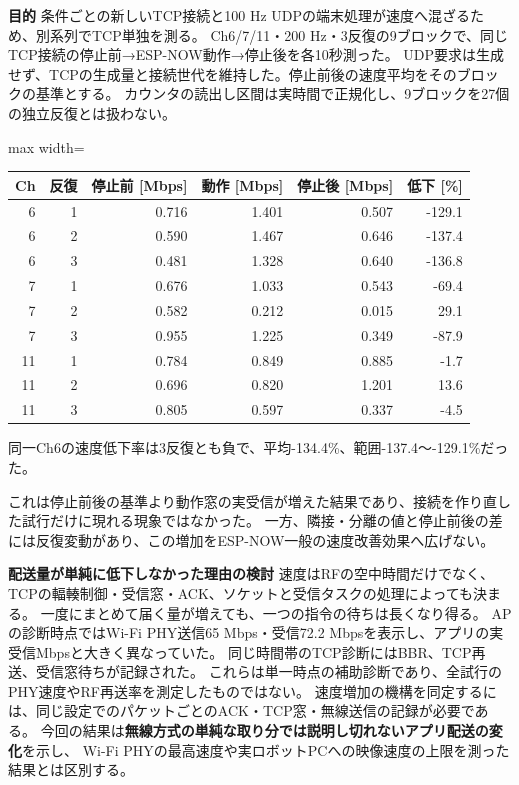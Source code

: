 \documentclass[a4paper,10pt]{ltjsarticle}
\begin{document}
\par\smallskip\noindent\textbf{目的}\quad
条件ごとの新しいTCP接続と100 Hz UDPの端末処理が速度へ混ざるため、別系列でTCP単独を測る。
Ch6/7/11・200 Hz・3反復の9ブロックで、同じTCP接続の停止前→ESP-NOW動作→停止後を各10秒測った。
UDP要求は生成せず、TCPの生成量と接続世代を維持した。停止前後の速度平均をそのブロックの基準とする。
カウンタの読出し区間は実時間で正規化し、9ブロックを27個の独立反復とは扱わない。
\begin{center}\small\begin{adjustbox}{max width=\linewidth}\begin{tabular}{rrrrrr}\toprule
Ch & 反復 & 停止前 [Mbps] & 動作 [Mbps] & 停止後 [Mbps] & 低下 [\%]\\\midrule
6 & 1 & 0.716 & 1.401 & 0.507 & -129.1\\
6 & 2 & 0.590 & 1.467 & 0.646 & -137.4\\
6 & 3 & 0.481 & 1.328 & 0.640 & -136.8\\
7 & 1 & 0.676 & 1.033 & 0.543 & -69.4\\
7 & 2 & 0.582 & 0.212 & 0.015 & 29.1\\
7 & 3 & 0.955 & 1.225 & 0.349 & -87.9\\
11 & 1 & 0.784 & 0.849 & 0.885 & -1.7\\
11 & 2 & 0.696 & 0.820 & 1.201 & 13.6\\
11 & 3 & 0.805 & 0.597 & 0.337 & -4.5\\
\bottomrule\end{tabular}\end{adjustbox}\end{center}
同一Ch6の速度低下率は3反復とも負で、平均-134.4\%、範囲-137.4〜-129.1\%だった。

これは停止前後の基準より動作窓の実受信が増えた結果であり、接続を作り直した試行だけに現れる現象ではなかった。
一方、隣接・分離の値と停止前後の差には反復変動があり、この増加をESP-NOW一般の速度改善効果へ広げない。
\par\smallskip\noindent\textbf{配送量が単純に低下しなかった理由の検討}\quad
速度はRFの空中時間だけでなく、TCPの輻輳制御・受信窓・ACK、ソケットと受信タスクの処理によっても決まる。
一度にまとめて届く量が増えても、一つの指令の待ちは長くなり得る。
APの診断時点ではWi-Fi PHY送信65 Mbps・受信72.2 Mbpsを表示し、アプリの実受信Mbpsと大きく異なっていた。
同じ時間帯のTCP診断にはBBR、TCP再送、受信窓待ちが記録された。
これらは単一時点の補助診断であり、全試行のPHY速度やRF再送率を測定したものではない。
速度増加の機構を同定するには、同じ設定でのパケットごとのACK・TCP窓・無線送信の記録が必要である。
今回の結果は\textbf{無線方式の単純な取り分では説明し切れないアプリ配送の変化}を示し、
Wi-Fi PHYの最高速度や実ロボットPCへの映像速度の上限を測った結果とは区別する。
\end{document}
